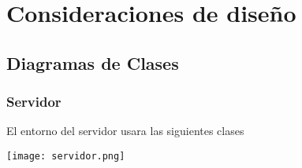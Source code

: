 \chapter{Consideraciones de diseño}

\section{Diagramas de Clases}

\subsection{Servidor}

El entorno del servidor usara las siguientes clases

\texttt{[image: servidor.png]}
